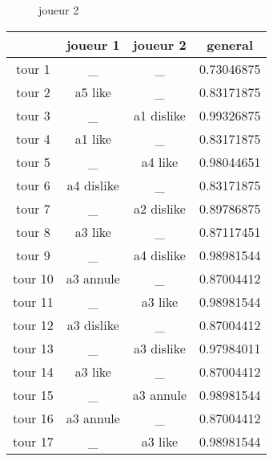 \documentclass{article}
\begin{document}
\begin{figure}
\centering
{}
\caption{joueur 2}
\end{figure}
\begin{tabular}{|c|c|c|c|}
\hline
& joueur 1 & joueur 2 & general \\
\hline
tour 1 & \_ & \_ & 0.73046875 \\
\hline
tour 2 & a5 like & \_ & 0.83171875 \\
\hline
tour 3 & \_ & a1 dislike & 0.99326875 \\
\hline
tour 4 & a1 like & \_ & 0.83171875 \\
\hline
tour 5 & \_ & a4 like & 0.98044651 \\
\hline
tour 6 & a4 dislike & \_ & 0.83171875 \\
\hline
tour 7 & \_ & a2 dislike & 0.89786875 \\
\hline
tour 8 & a3 like & \_ & 0.87117451 \\
\hline
tour 9 & \_ & a4 dislike & 0.98981544 \\
\hline
tour 10 & a3 annule & \_ & 0.87004412 \\
\hline
tour 11 & \_ & a3 like & 0.98981544 \\
\hline
tour 12 & a3 dislike & \_ & 0.87004412 \\
\hline
tour 13 & \_ & a3 dislike & 0.97984011 \\
\hline
tour 14 & a3 like & \_ & 0.87004412 \\
\hline
tour 15 & \_ & a3 annule & 0.98981544 \\
\hline
tour 16 & a3 annule & \_ & 0.87004412 \\
\hline
tour 17 & \_ & a3 like & 0.98981544 \\
\hline
\end{tabular}
\end{document}
